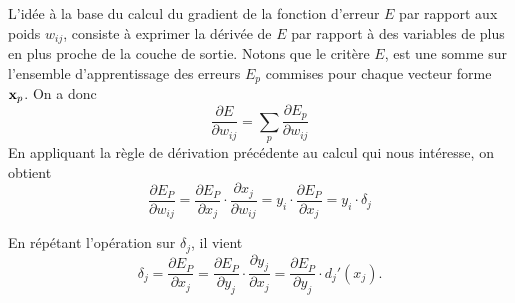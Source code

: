 L'id\'ee \`a la base du calcul du gradient de la fonction d'erreur $E$ par rapport
aux poids $w_{ij}$,
consiste \`a exprimer la d\'eriv\'ee de $E$ par rapport \`a des variables
de plus en plus proche de la couche de sortie. Notons que le crit\`ere $E$,
est une somme sur l'ensemble d'apprentissage  des erreurs $E_p$ commises pour
 chaque vecteur forme $\mbox{\bf x}_p$. On a donc 
$$
\frac{\partial E}{\partial w_{ij}} =\sum_p \frac{\partial E_p}{\partial w_{ij}}
$$
 En appliquant la  r\`egle de
d\'erivation pr\'ec\'edente au calcul qui nous int\'eresse, on obtient
$$
\frac{\partial E_P}{\partial w_{ij}} =
\frac{\partial E_P}{\partial x_{j}} \cdot \frac{\partial x_j}{\partial w_{ij}}=
y_i \cdot \frac{\partial E_P}{\partial x_{j}}=
y_i \cdot \delta_j
$$

En r\'ep\'etant l'op\'eration sur $\delta_j$, il vient
$$
\delta_j= \frac{\partial E_P}{\partial x_{j}}=  \frac{\partial E_P}{\partial y_{j}} \cdot 
                                              \frac{\partial y_j}{\partial x_{j}}
                                           =  \frac{\partial E_P}{\partial y_{j}} \cdot
                                               d_j'(x_j).   
$$

